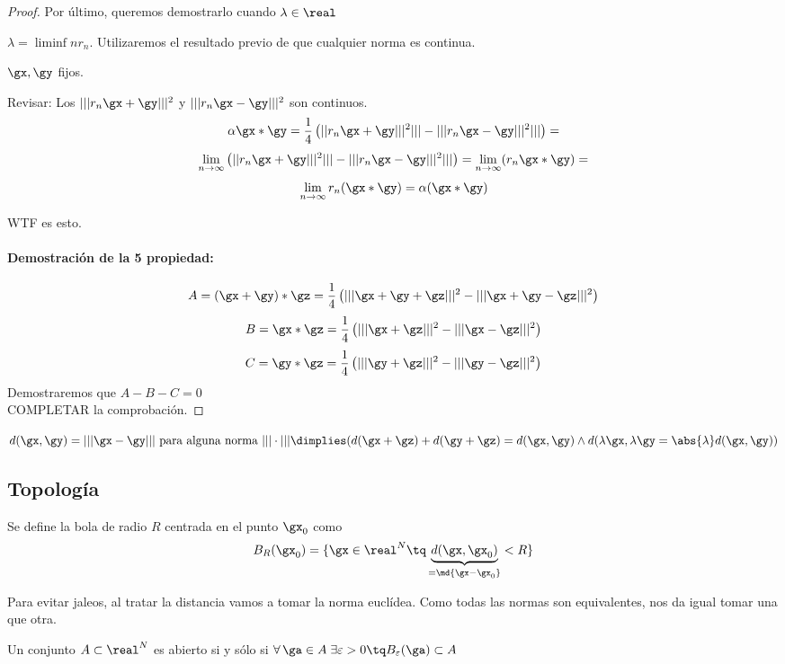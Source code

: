 \documentclass{apuntes}
\begin{document}
\begin{proof}
Por último, queremos demostrarlo cuando $\lambda \in \real$

$\lambda = \liminf{n} r_n$. Utilizaremos el resultado previo de que cualquier norma es continua.

$\gx, \gy$ fijos.

Revisar: Los $|||r_n \gx + \gy|||^2$ y  $|||r_n \gx - \gy|||^2$ son continuos.
$$\alpha \gx*\gy = \frac{1}{4}\left(||r_n \gx + \gy|||^2||| -|||r_n \gx - \gy|||^2||| \right) =$$
$$\lim_{n\to\infty} \left(||r_n \gx + \gy|||^2||| -|||r_n \gx - \gy|||^2||| \right) = \lim_{n\to\infty} (r_n\gx*\gy) = $$
$$\lim_{n\to\infty} r_n(\gx*\gy) = \alpha (\gx*\gy)$$

WTF es esto.

\paragraph{Demostración de la 5 propiedad:}
$$A = (\gx+\gy)*\gz = \frac{1}{4} \left( |||\gx+\gy+\gz|||^2 - |||\gx+\gy-\gz|||^2\right)$$
$$B =\gx*\gz = \frac{1}{4} \left( |||\gx+\gz|||^2 - |||\gx-\gz|||^2\right)$$
$$C =\gy*\gz = \frac{1}{4} \left( |||\gy+\gz|||^2 - |||\gy-\gz|||^2\right)$$
Demostraremos que $A-B-C=0$\\
COMPLETAR la comprobación.
\end{proof}

\begin{remark}
$d(\gx,\gy) = |||\gx-\gy||| \text{ para alguna norma }|||\cdot||| \dimplies (d(\gx+\gz)+d(\gy+\gz) = d(\gx,\gy) \wedge d(\lambda \gx,\lambda \gy = \abs{\lambda} d(\gx,\gy))$
\end{remark}

\subsection{Topología}
\begin{defn}[Bola] Se define la bola de radio $R$ centrada en el punto $\gx_0$ como 
\[B_R(\gx_0) =\{\gx \in \real^N \tq \underbrace{d(\gx,\gx_0)}_{=\md{\gx-\gx_0}} < R \} \]
\end{defn}


Para evitar jaleos, al tratar la distancia vamos a tomar la norma euclídea. Como todas las normas son equivalentes, nos da igual tomar una que otra.
\begin{defn} Un conjunto $A \subset \real^N$ es abierto si y sólo si $\forall\, \ga\in A\; \exists \varepsilon > 0 \tq B_\varepsilon(\ga) \subset A$
\end{defn}
\end{document}
